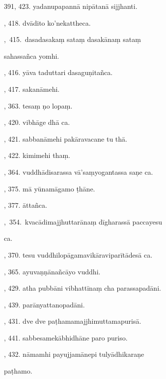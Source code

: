 391, 423. yadanupapannā nipātanā sijjhanti.\hfill \pageref{sut:391}\par {}, 418. dvādito ko’nekattheca.\hfill \pageref{sut:392}\par {},~415.~dasadasakaṃ sataṃ dasakānaṃ sataṃ\par \noindent
\hspace{15mm} sahassañca yomhi.\hfill \pageref{sut:393}\par {}, 416. yāva taduttari dasaguṇitañca.\hfill \pageref{sut:394}\par {}, 417. sakanāmehi.\hfill \pageref{sut:395}\par {}, 363. tesaṃ ṇo lopaṃ.\hfill \pageref{sut:396}\par {}, 420. vibhāge dhā ca.\hfill \pageref{sut:397}\par {}, 421. sabbanāmehi pakāravacane tu thā.\hfill \pageref{sut:398}\par {}, 422. kimimehi thaṃ.\hfill \pageref{sut:399}\par {}, 364. vuddhādisarassa vā’saṃyogantassa saṇe ca.\hfill \pageref{sut:400}\par {}, 375. mā yūnamāgamo ṭhāne.\hfill \pageref{sut:401}\par {}, 377. āttañca.\hfill \pageref{sut:402}\par {},~354.~kvacādimajjhuttarānaṃ dīgharassā paccayesu\par \noindent
\hspace{15mm} ca.\hfill \pageref{sut:403}\par {}, 370. tesu vuddhilopāgamavikāraviparītādesā ca.\hfill \pageref{sut:404}\par {}, 365. ayuvaṇṇānañcāyo vuddhi.\hfill \pageref{sut:405}\par {}, 429. atha pubbāni vibhattīnaṃ cha parassapadāni.\hfill \pageref{sut:406}\par {}, 439. parānyattanopadāni.\hfill \pageref{sut:407}\par {}, 431. dve dve paṭhamamajjhimuttamapurisā.\hfill \pageref{sut:408}\par {}, 441. sabbesamekābhidhāne paro puriso.\hfill \pageref{sut:409}\par {}, 432. nāmamhi payujjamānepi tulyādhikaraṇe\par \noindent
\hspace{15mm} paṭhamo.\hfill \pageref{sut:410}\par \noindent
